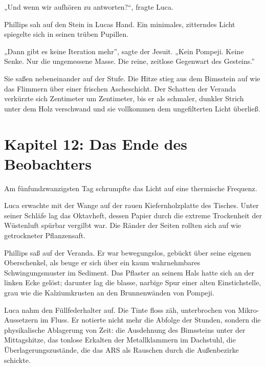 \documentclass[
  ngerman,
]{article}
\begin{document}
„Und wenn wir aufhören zu antworten?{\kern0pt}``, fragte Luca.

Phillips sah auf den Stein in Lucas Hand. Ein minimales, zitterndes
Licht spiegelte sich in seinen trüben Pupillen.

„Dann gibt es keine Iteration mehr'', sagte der Jesuit. „Kein Pompeji.
Keine Senke. Nur die ungemessene Masse. Die reine, zeitlose Gegenwart
des Gesteins.''

Sie saßen nebeneinander auf der Stufe. Die Hitze stieg aus dem Bimsstein
auf wie das Flimmern über einer frischen Ascheschicht. Der Schatten der
Veranda verkürzte sich Zentimeter um Zentimeter, bis er als schmaler,
dunkler Strich unter dem Holz verschwand und sie vollkommen dem
ungefilterten Licht überließ.

\section{}\label{section-5}

\section{\texorpdfstring{\textbf{Kapitel 12: Das Ende des
Beobachters}}{Kapitel 12: Das Ende des Beobachters}}\label{kapitel-12-das-ende-des-beobachters}

Am fünfundzwanzigsten Tag schrumpfte das Licht auf eine thermische
Frequenz.

Luca erwachte mit der Wange auf der rauen Kiefernholzplatte des Tisches.
Unter seiner Schläfe lag das Oktavheft, dessen Papier durch die extreme
Trockenheit der Wüstenluft spürbar vergilbt war. Die Ränder der Seiten
rollten sich auf wie getrockneter Pflanzensaft.

Phillips saß auf der Veranda. Er war bewegungslos, gebückt über seine
eigenen Oberschenkel, als beuge er sich über ein kaum wahrnehmbares
Schwingungsmuster im Sediment. Das Pflaster an seinem Hals hatte sich an
der linken Ecke gelöst; darunter lag die blasse, narbige Spur einer
alten Einstichstelle, grau wie die Kalziumkrusten an den Brunnenwänden
von Pompeji.

Luca nahm den Füllfederhalter auf. Die Tinte floss zäh, unterbrochen von
Mikro-Aussetzern im Fluss. Er notierte nicht mehr die Abfolge der
Stunden, sondern die physikalische Ablagerung von Zeit: die Ausdehnung
des Bimssteins unter der Mittagshitze, das tonlose Erkalten der
Metallklammern im Dachstuhl, die Überlagerungszustände, die das ARS als
Rauschen durch die Außenbezirke schickte.
\end{document}
